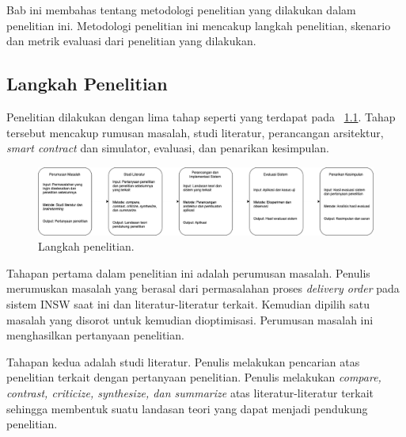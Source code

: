 \chapter{\babTiga}
\label{bab:3}

Bab ini membahas tentang metodologi penelitian yang dilakukan dalam penelitian ini. Metodologi penelitian ini mencakup langkah penelitian, skenario dan metrik evaluasi dari penelitian yang dilakukan.


\section{Langkah Penelitian}
\label{sec:langkahPenelitian}

Penelitian dilakukan dengan lima tahap seperti yang terdapat pada 
\pic~\ref{fig:metode}. Tahap tersebut mencakup rumusan masalah, studi literatur, perancangan arsitektur, \textit{smart contract} dan simulator, evaluasi, dan penarikan kesimpulan.

\begin{figure}
	\centering
	\includegraphics[width=\textwidth]{assets/pics/metode}
	\caption{Langkah penelitian.}
	\label{fig:metode}
\end{figure}

Tahapan pertama dalam penelitian ini adalah perumusan masalah. Penulis merumuskan masalah yang berasal dari permasalahan proses \textit{delivery order} pada sistem INSW saat ini dan literatur-literatur terkait. Kemudian dipilih satu masalah yang disorot untuk kemudian dioptimisasi. Perumusan masalah ini menghasilkan pertanyaan penelitian.

Tahapan kedua adalah studi literatur. Penulis melakukan pencarian atas penelitian terkait dengan pertanyaan penelitian. Penulis melakukan \textit{compare, contrast, criticize, synthesize, dan summarize} atas literatur-literatur terkait sehingga membentuk suatu landasan teori yang dapat menjadi pendukung penelitian. 

